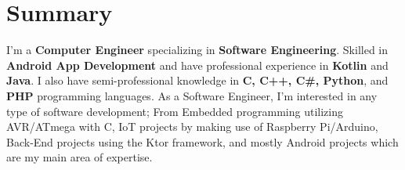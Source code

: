 

\textcolor{darkgray}{\noindent\makebox[\linewidth]{\rule{\maxdimen}{2pt}}}

\section*{\LARGE{Summary}}
I'm a \textbf{Computer Engineer} specializing in \textbf{Software Engineering}.
Skilled in \textbf{Android App Development} and have professional experience in \textbf{Kotlin} and \textbf{Java}.
I also have semi-professional knowledge in \textbf{C, C++, C\#, Python}, and \textbf{PHP} programming languages.
As a Software Engineer, I'm interested in any type of software development;
From Embedded programming utilizing AVR/ATmega with C, IoT projects by making use of Raspberry Pi/Arduino,
Back-End projects using the Ktor framework, and mostly Android projects which are my main area of expertise.\\
\textcolor{darkgray}{\noindent\makebox[\linewidth]{\rule{\maxdimen}{2pt}}}

\begin{multicols}{2}
    

    
\end{multicols}
\textcolor{darkgray}{\noindent\makebox[\linewidth]{\rule{\maxdimen}{2pt}}}

